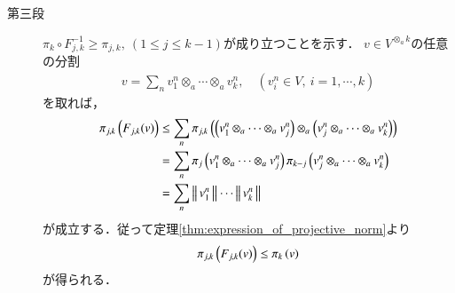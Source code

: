 \begin{prf}
\begin{description}
			\item[第三段]
				$\pi_k \circ F^{-1}_{j,k} \geq \pi_{j,k},\ (1 \leq j \leq k-1)$が成り立つことを示す．
				$v \in V^{\otimes_a k}$の任意の分割
				\begin{align}
					v = \sum_n v^n_1 \otimes_a \cdots \otimes_a v^n_k,
					\quad (v^n_i \in V,\ i=1,\cdots,k)
				\end{align}
				を取れば，
				\begin{align}
					\projectivenorm{F_{j,k}(v)}{j,k}
					&\leq \sum_n \projectivenorm{\left( v^n_1 \otimes_a \cdots \otimes_a v^n_j \right) \otimes_a \left( v^n_j \otimes_a \cdots \otimes_a v^n_k \right)}{j,k} \\
					&= \sum_n \projectivenorm{v^n_1 \otimes_a \cdots \otimes_a v^n_j}{j}
						\projectivenorm{v^n_j \otimes_a \cdots \otimes_a v^n_k}{k-j} \\
					&= \sum_n \Norm{v^n_1}{} \cdots \Norm{v^n_k}{}
				\end{align}
				が成立する．従って定理\ref{thm:expression_of_projective_norm}より
				\begin{align}
					\projectivenorm{F_{j,k}(v)}{j,k} \leq \projectivenorm{v}{k}
				\end{align}
				が得られる．
				\QED
		\end{description}
	\end{prf}
	
